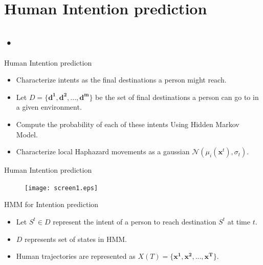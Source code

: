 \documentclass{beamer}
\begin{document}
\section{Human Intention prediction}

\subsection{•}

\begin{frame}{Human Intention prediction}
\begin{itemize}
\item{Characterize intents as the final destinations a person might reach.}
\item{Let $D = \{\mathbf{d^1,d^2,...,d^m}\}$ be the set of final destinations a person can go to in a given environment.}
\item{Compute the probability of each of these intents Using Hidden Markov Model.}
\item{Characterize local Haphazard movements as a gaussian $\mathcal{N}(\mu_i(\mathbf{x}^{t}),\sigma_t)$. }
\end{itemize}
\end{frame}
\begin{frame}{Human Intention prediction}
\begin{figure}
\centering
\texttt{[image: screen1.eps]}
\end{figure}
\end{frame}
\begin{frame}{HMM for Intention prediction}
\begin{itemize}
\item{ Let $S^t \in D$ represent the intent of a person to reach destination $S^t$ at time $t$.}
\item{$D$ represents set of states in HMM.}
\item{Human trajectories are represented as $X(T) = \{\mathbf{x^1,x^2,...,x^T}\}$.}
\end{itemize}

\end{frame}
\end{document}
